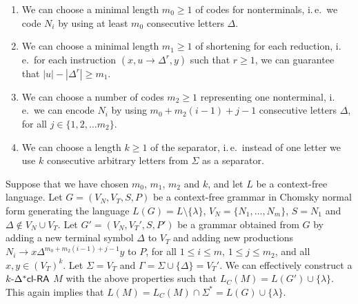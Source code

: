 \begin{enumerate}
\item\label{request:m_0} We can choose a minimal length $m_0 \ge 1$ of codes for nonterminals, i.\,e.\ we code $N_i$ by using at least $m_0$ consecutive letters $\Delta$.
\item\label{request:m_1} We can choose a minimal length $m_1 \ge 1$ of shortening for each reduction, i.\,e.\ for each instruction $(x, u \to \Delta^r, y)$ such that $r \ge 1$, we can guarantee that $|u| - |\Delta^r| \ge m_1$.
\item\label{request:m_2} We can choose a number of codes $m_2 \ge 1$ representing one nonterminal, i.\,e.\ we can encode $N_i$ by using $m_0 + m_2 (i - 1) + j - 1$ consecutive letters $\Delta$, for all $j \in \{1, 2, \ldots m_2\}$.
\item\label{request:k} We can choose a length $k \ge 1$ of the separator, i.\,e.\ instead of one letter we use $k$ consecutive arbitrary letters from $\Sigma$ as a separator.
\end{enumerate}

Suppose that we have chosen $m_0$, $m_1$, $m_2$ and $k$, and let $L$ be a context-free language. Let $G = (V_N, V_T, S, P)$ be a context-free grammar in Chomsky normal form generating the language $L(G) = L \setminus \{\lambda\}$, $V_N = \{N_1, \ldots, N_m\}$, $S = N_1$ and $\Delta \not\in V_N \cup V_T$. Let $G' = (V_N, V_T', S, P')$ be a grammar obtained from $G$ by adding a new terminal symbol $\Delta$ to $V_T$ and adding new productions $N_i \to x \Delta^{m_0 + m_2 (i - 1) + j - 1} y$ to $P$, for all $1 \le i \le m$, $1 \le j \le m_2$, and all $x, y \in (V_T)^k$. Let $\Sigma = V_T$ and $\Gamma = \Sigma \cup \{ \Delta \} = V_T'$. We can effectively construct a $\kDXclRA[k]$ $M$ with the above properties such that $L_C(M) = L(G') \cup \{ \lambda \}$. This again implies that $L(M) = L_C(M) \cap \Sigma^* = L(G) \cup \{ \lambda \}$.

